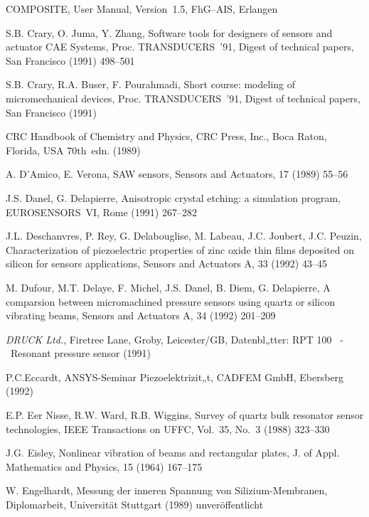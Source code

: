 \begin{thebibliography}{xxx}
 {\sf COMPOSITE}, User Manual, Version~1.5, FhG--AIS, Erlangen

 S.B. Crary, O. Juma, Y. Zhang, Software tools for designers of sensors and
 actuator CAE Systems, Proc. TRANSDUCERS~'91, Digest of technical papers,
 San Francisco (1991) 498--501

 S.B. Crary, R.A. Buser, F. Pourahmadi, Short course: modeling of
 micromechanical devices, Proc. TRANSDUCERS~'91, Digest of technical papers,
 San Francisco (1991)

 CRC Handbook of Chemistry and Physics, CRC Press, Inc., Boca Raton,
 Florida, USA 70th~edn. (1989)

  A. D'Amico, E. Verona, SAW sensors, Sensors and Actuators, 17 (1989) 55--56

 J.S. Danel, G. Delapierre, Anisotropic crystal etching: a simulation
 program, EUROSENSORS~VI, Rome (1991) 267--282

 J.L. Deschanvres, P. Rey, G. Delabouglise, M. Labeau, J.C. Joubert,
 J.C. Peuzin, Characterization of piezoelectric properties of zinc oxide
 thin films deposited on silicon for sensors applications, Sensors and
 Actuators A, 33 (1992) 43--45

 M. Dufour, M.T. Delaye, F. Michel, J.S. Danel, B. Diem, G. Delapierre,
 A comparsion between micromachined pressure sensors using quartz or silicon
 vibrating beams, Sensors and Actuators A, 34 (1992) 201--209

 {\em DRUCK Ltd.}, Firetree Lane, Groby, Leicester/GB, Datenbl„tter:
 {\sf RPT 100} ~-~Resonant pressure sensor (1991)

 P.C.Eccardt, {\sf ANSYS}\--Seminar Piezo\-elek\-tri\-zi\-t„t,
 CAD\-FEM GmbH, Ebers\-berg (1992)

 E.P. Eer Nisse, R.W. Ward, R.B. Wiggins, Survey of quartz bulk resonator
 sensor technologies, IEEE Transactions on UFFC, Vol.~35, No.~3
 (1988) 323--330

 J.G. Eisley, Nonlinear vibration of beams and rectangular plates,
 J. of Appl. Mathematics and Physics, 15 (1964) 167--175

 W. Engelhardt, Messung der inneren Spannung von Silizium-Membranen,
 Diplomarbeit, Universität Stuttgart (1989) unveröffentlicht


\end{thebibliography}
